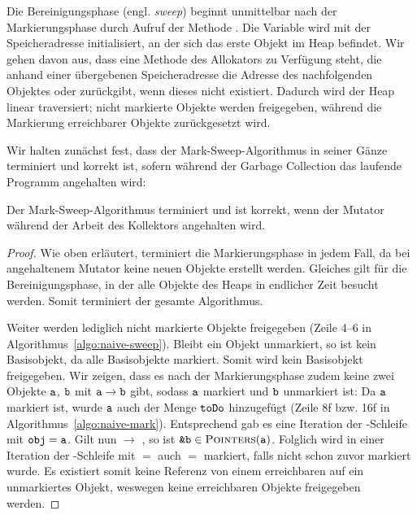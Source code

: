 Die Bereinigungsphase (engl. \textit{sweep}) beginnt unmittelbar nach der Markierungsphase durch Aufruf der Methode .
Die Variable  wird mit der Speicheradresse initialisiert, an der sich das erste Objekt im Heap befindet.
Wir gehen davon aus, dass eine Methode  des Allokators zu Verfügung steht, die anhand einer übergebenen Speicheradresse die Adresse des nachfolgenden Objektes oder \Null zurückgibt, wenn dieses nicht existiert.
Dadurch wird der Heap linear traversiert; nicht markierte Objekte werden freigegeben, während die Markierung erreichbarer Objekte zurückgesetzt wird.

Wir halten zunächst fest, dass der Mark-Sweep-Algorithmus in seiner Gänze terminiert und korrekt ist, sofern während der Garbage Collection das laufende Programm angehalten wird:

\begin{mybox}
\begin{satz}
	\label{satz:mark-sweep-correctness}
	Der Mark-Sweep-Algorithmus terminiert und ist korrekt, wenn der Mutator während der Arbeit des Kollektors angehalten wird.
\end{satz}
\end{mybox}

\begin{proof}
	Wie oben erläutert, terminiert die Markierungsphase in jedem Fall, da bei angehaltenem Mutator keine neuen Objekte erstellt werden.
	Gleiches gilt für die Bereinigungsphase, in der alle Objekte des Heaps in endlicher Zeit besucht werden.
	Somit terminiert der gesamte Algorithmus.
	
	Weiter werden lediglich nicht markierte Objekte freigegeben (Zeile 4--6 in Algorithmus~\ref{algo:naive-sweep}).
	Bleibt ein Objekt  unmarkiert, so ist  kein Basisobjekt, da  alle Basisobjekte markiert.
	Somit wird kein Basisobjekt freigegeben.
	Wir zeigen, dass es nach der Markierungsphase zudem keine zwei Objekte $\texttt{a}$, $\texttt{b}$ mit $\texttt{a} \rightarrow \texttt{b}$ gibt, sodass $\texttt{a}$ markiert und $\texttt{b}$ unmarkiert ist:
	Da $\texttt{a}$ markiert ist, wurde $\texttt{a}$ auch der Menge $\texttt{toDo}$ hinzugefügt (Zeile 8f bzw. 16f in Algorithmus~\ref{algo:naive-mark}).
	Entsprechend gab es eine Iteration der \WHILE-Schleife mit $\texttt{obj} = \texttt{a}$.
	Gilt nun  $\rightarrow$ , so ist $\texttt{\&b} \in \textsc{Pointers}(\texttt{a})$.
	Folglich wird in einer Iteration der \FOREACH-Schleife mit  $=$  auch  $=$  markiert, falls  nicht schon zuvor markiert wurde.
	Es existiert somit keine Referenz von einem erreichbaren auf ein unmarkiertes Objekt, weswegen keine erreichbaren Objekte freigegeben werden.
\end{proof}

